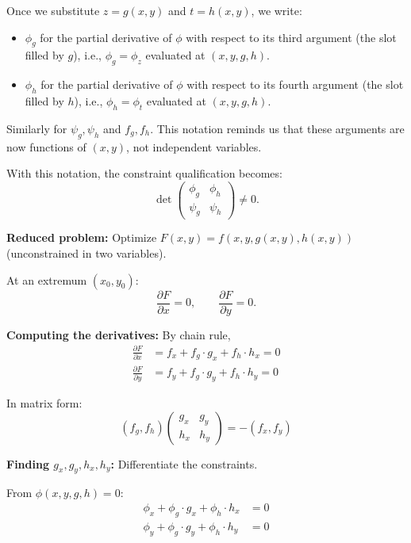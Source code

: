 \documentclass[11pt]{report}
\begin{document}
\begin{remark}
Once we substitute $z = g(x,y)$ and $t = h(x,y)$, we write:
\begin{itemize}
    \item $\phi_g$ for the partial derivative of $\phi$ with respect to its third argument (the slot filled by $g$), i.e., $\phi_g = \phi_z$ evaluated at $(x, y, g, h)$.
    \item $\phi_h$ for the partial derivative of $\phi$ with respect to its fourth argument (the slot filled by $h$), i.e., $\phi_h = \phi_t$ evaluated at $(x, y, g, h)$.
\end{itemize}
Similarly for $\psi_g, \psi_h$ and $f_g, f_h$. This notation reminds us that these arguments are now functions of $(x, y)$, not independent variables.
\end{remark}

With this notation, the constraint qualification becomes:
\[
\det \begin{pmatrix} \phi_g & \phi_h \\ \psi_g & \psi_h \end{pmatrix} \neq 0.
\]

\textbf{Reduced problem:} Optimize $F(x, y) = f(x, y, g(x,y), h(x,y))$ (unconstrained in two variables).

At an extremum $(x_0, y_0)$:
\[
\frac{\partial F}{\partial x} = 0, \qquad \frac{\partial F}{\partial y} = 0.
\]

\textbf{Computing the derivatives:} By chain rule,
\begin{align*}
\frac{\partial F}{\partial x} &= f_x + f_g \cdot g_x + f_h \cdot h_x = 0 \\
\frac{\partial F}{\partial y} &= f_y + f_g \cdot g_y + f_h \cdot h_y = 0
\end{align*}

In matrix form:
\[
(f_g, f_h) \begin{pmatrix} g_x & g_y \\ h_x & h_y \end{pmatrix} = -(f_x, f_y) \tag{$*$}
\]

\textbf{Finding $g_x, g_y, h_x, h_y$:} Differentiate the constraints.

From $\phi(x, y, g, h) = 0$:
\begin{align*}
\phi_x + \phi_g \cdot g_x + \phi_h \cdot h_x &= 0 \\
\phi_y + \phi_g \cdot g_y + \phi_h \cdot h_y &= 0
\end{align*}
\end{document}
